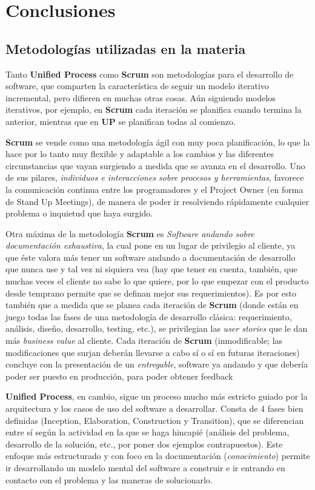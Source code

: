 \section{Conclusiones}
\subsection{Metodologías utilizadas en la materia}
Tanto \textbf{Unified Process} como \textbf{Scrum} son metodologías para el desarrollo de software, que comparten la característica de seguir un modelo iterativo incremental, pero difieren en muchas otras cosas. Aún siguiendo modelos iterativos, por ejemplo, en \textbf{Scrum} cada iteración se planifica cuando termina la anterior, mientras que en \textbf{UP} se planifican todas al comienzo.

\textbf{Scrum} se vende como una metodología ágil con muy poca planificación, lo que la hace por lo tanto muy flexible y adaptable a los cambios y las diferentes circunstancias que vayan surgiendo a medida que se avanza en el desarrollo. Uno de sus pilares, \emph{individuos e interacciones sobre procesos y herramientas}, favorece la comunicación continua entre los programadores y el Project Owner (en forma de Stand Up Meetings), de manera de poder ir resolviendo rápidamente cualquier problema o inquietud que haya surgido. 

Otra máxima de la metodología \textbf{Scrum} es \emph{Software andando sobre documentación exhaustiva}, la cual pone en un lugar de privilegio al cliente, ya que éste valora más tener un software andando a documentación de desarrollo que nunca use y tal vez ni siquiera vea (hay que tener en cuenta, también, que muchas veces el cliente no sabe lo que quiere, por lo que empezar con el producto desde temprano permite que se definan mejor sus requerimientos). Es por esto también que a medida que se planea cada iteración de \textbf{Scrum} (donde están en juego todas las fases de una metodología de desarrollo clásica: requerimiento, análisis, diseño, desarrollo, testing, etc.), se privilegian las \emph{user stories} que le dan más \emph{business value} al cliente. Cada iteración de \textbf{Scrum} (inmodificable; las modificaciones que surjan deberán llevarse a cabo sí o sí en futuras iteraciones) concluye con la presentación de un \emph{entregable}, software ya andando y que debería poder ser puesto en producción, para poder obtener feedback

\textbf{Unified Process}, en cambio, sigue un proceso mucho más estricto guiado por la arquitectura y los casos de uso del software a desarrollar. Consta de 4 fases bien definidas (Inception, Elaboration, Construction y Transition), que se diferencian entre sí según la actividad en la que se haga hincapié (análisis del problema, desarrollo de la solución, etc., por poner dos ejemplos contrapuestos). Este enfoque más estructurado y con foco en la documentación (\emph{conocimiento}) permite ir desarrollando un modelo mental del software a construir e ir entrando en contacto con el problema y las maneras de solucionarlo.

